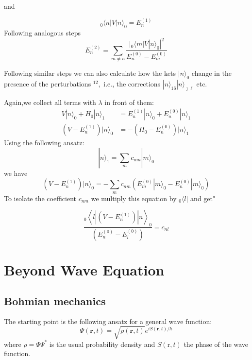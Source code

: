 and
\begin{qt}
\begin{equation}
    _{0}\langle n|V| n\rangle_{0}=E_{n}^{(1)}
\end{equation}
Following analogous steps
\begin{equation}
E_{n}^{(2)}=\sum_{m \neq n} \frac{|_{0}\langle m|V| n\rangle_{0}|^2}{E_{n}^{(0)}-E_{m}^{(0)}}
\end{equation}
\end{qt}
Following similar steps we can also calculate how the kets $|n\rangle_{0}$ change in the presence of the perturbations $^{12},$ i.e., the corrections $|n\rangle_{16}|n\rangle_{\jmath \ell}$ etc.

Again,we collect all terms with $\lambda$ in front of them:
$$
\begin{aligned}
V|n\rangle_{0}+H_{0}|n\rangle_{1} &=E_{n}^{(1)}|n\rangle_{0}+E_{n}^{(0)}|n\rangle_{1} \\
\left(V-E_{n}^{(1)}\right)|n\rangle_{0} &=-\left(H_{0}-E_{n}^{(0)}\right)|n\rangle_{1}
\end{aligned}
$$
Using the following ansatz:
$$
|n\rangle_{1}=\sum_{m} c_{n m}|m\rangle_{0}
$$
we have
$$
\left(V-E_{n}^{(1)}\right)|n\rangle_{0}=-\sum_{m} c_{n m}\left(E_{m}^{(0)}|m\rangle_{0}-E_{n}^{(0)}|m\rangle_{0}\right)
$$
To isolate the coefficient $c_{n m}$ we multiply this equation by $_0\langle l|$ and get"
\begin{qt}
\begin{equation}
\frac{_{0}\left\langle l\left|\left(V-E_{n}^{(1)}\right)\right| n\right\rangle_{0}}{\left(E_{n}^{(0)}-E_{l}^{(0)}\right)}=c_{n l}
\end{equation}
\end{qt}

\section{Beyond Wave Equation}
\subsection{Bohmian mechanics}
The starting point is the following ansatz for a general wave function:
\begin{equation}
\Psi(\mathbf{r}, t)=\sqrt{\rho(\mathbf{r}, t)} e^{i S(\mathbf{r}, t) / \hbar}
\end{equation}
where $\rho=\Psi \Psi^{*}$ is the usual probability density and $S(\mathrm{r}, t)$ the phase of the wave function.

